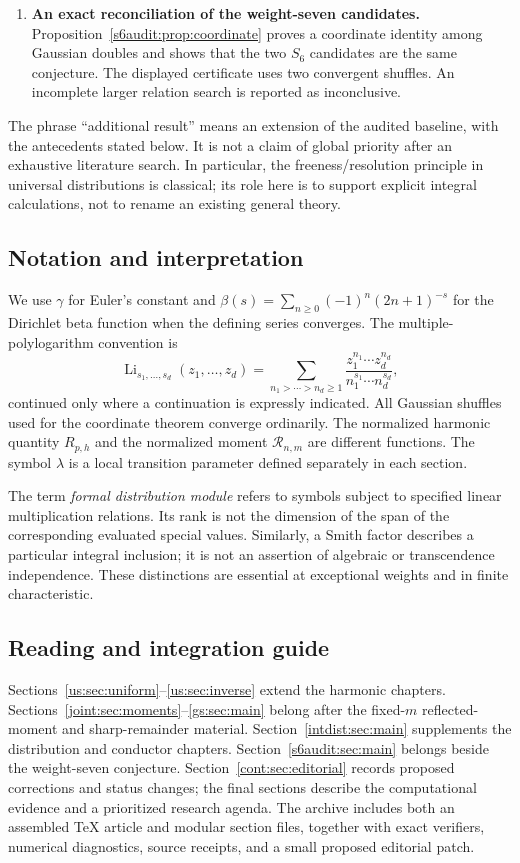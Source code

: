 \begin{enumerate}[leftmargin=*,label=\arabic*.]
\item \textbf{An exact reconciliation of the weight-seven
candidates.} Proposition~\ref{s6audit:prop:coordinate} proves a
coordinate identity among Gaussian doubles and shows that the two
$S_6$ candidates are the same conjecture. The displayed certificate
uses two convergent shuffles. An incomplete larger relation search
is reported as inconclusive.
\end{enumerate}

The phrase ``additional result'' means an extension of the audited
baseline, with the antecedents stated below. It is not a claim of
global priority after an exhaustive literature search. In particular,
the freeness/resolution principle in universal distributions is
classical; its role here is to support explicit integral calculations,
not to rename an existing general theory.

\subsection{Notation and interpretation}

We use $\gamma$ for Euler's constant and
$\beta(s)=\sum_{n\ge0}(-1)^n(2n+1)^{-s}$ for the Dirichlet beta
function when the defining series converges. The multiple-polylogarithm
convention is
\[
 \operatorname{Li}_{s_1,\ldots,s_d}(z_1,\ldots,z_d)
 =\sum_{n_1>\cdots>n_d\ge1}
    \frac{z_1^{n_1}\cdots z_d^{n_d}}
         {n_1^{s_1}\cdots n_d^{s_d}},
\]
continued only where a continuation is expressly indicated. All
Gaussian shuffles used for the coordinate theorem converge ordinarily.
The normalized harmonic quantity $R_{p,h}$ and the normalized moment
$\mathcal R_{n,m}$ are different functions. The symbol $\lambda$ is a
local transition parameter defined separately in each section.

The term \emph{formal distribution module} refers to symbols subject
to specified linear multiplication relations. Its rank is not the
dimension of the span of the corresponding evaluated special values.
Similarly, a Smith factor describes a particular integral inclusion;
it is not an assertion of algebraic or transcendence independence.
These distinctions are essential at exceptional weights and in finite
characteristic.

\subsection{Reading and integration guide}

Sections~\ref{us:sec:uniform}--\ref{us:sec:inverse} extend the harmonic
chapters. Sections~\ref{joint:sec:moments}--\ref{gs:sec:main} belong
after the fixed-$m$ reflected-moment and sharp-remainder material.
Section~\ref{intdist:sec:main} supplements the distribution and
conductor chapters. Section~\ref{s6audit:sec:main} belongs beside the
weight-seven conjecture. Section~\ref{cont:sec:editorial} records
proposed corrections and status changes; the final sections describe
the computational evidence and a prioritized research agenda.
The archive includes both an assembled \TeX{} article and modular
section files, together with exact verifiers, numerical diagnostics,
source receipts, and a small proposed editorial patch.
